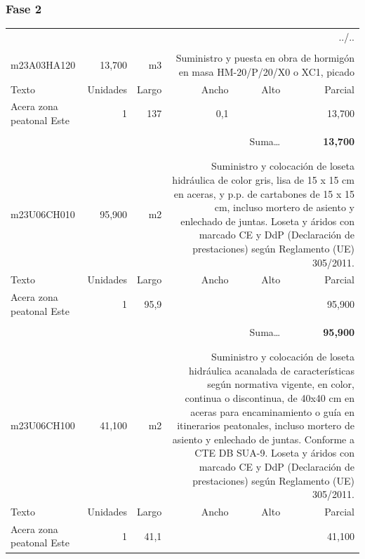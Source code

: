 \documentclass{book}%
\begin{document}
%
\subsubsection{Fase 2}%
\begin{longtable}{lrrrrr}%
\multicolumn{6}{r}{../..}\\%
\endfoot%
\endlastfoot%
&&&&&\\%
m23A03HA120&    13,700& m3&\multicolumn{3}{p{6cm}}{\scriptsize Suministro y puesta en obra de hormigón en masa HM-20/P/20/X0 o XC1, picado\normalsize}\\%
Texto&Unidades&Largo&Ancho&Alto&Parcial\\%
\hline%
\multicolumn{1}{p{3.5cm}}{Acera zona peatonal Este}&1&137&0,1&&    13,700\\%
&&&&&\\%
\multicolumn{5}{r}{Suma\ldots}&\textbf{    13,700}\\%
\hline%
&&&&&\\%
&&&&&\\%
m23U06CH010&    95,900& m2&\multicolumn{3}{p{6cm}}{\scriptsize Suministro y colocación de loseta hidráulica de color gris, lisa de 15 x 15 cm en aceras, y p.p. de cartabones de 15 x 15 cm, incluso mortero de asiento y enlechado de juntas. Loseta y áridos con marcado CE y DdP (Declaración de prestaciones) según Reglamento (UE) 305/2011.\normalsize}\\%
Texto&Unidades&Largo&Ancho&Alto&Parcial\\%
\hline%
\multicolumn{1}{p{3.5cm}}{Acera zona peatonal Este}&1&95,9&&&    95,900\\%
&&&&&\\%
\multicolumn{5}{r}{Suma\ldots}&\textbf{    95,900}\\%
\hline%
&&&&&\\%
&&&&&\\%
m23U06CH100&    41,100& m2&\multicolumn{3}{p{6cm}}{\scriptsize Suministro y colocación de loseta hidráulica acanalada de características según normativa vigente, en color, continua o discontinua, de 40x40 cm en aceras para encaminamiento o guía en itinerarios peatonales, incluso mortero de asiento y enlechado de juntas. Conforme a CTE DB SUA-9. Loseta y áridos con marcado CE y DdP (Declaración de prestaciones) según Reglamento (UE) 305/2011.\normalsize}\\%
Texto&Unidades&Largo&Ancho&Alto&Parcial\\%
\hline%
\multicolumn{1}{p{3.5cm}}{Acera zona peatonal Este}&1&41,1&&&    41,100\\%

\end{longtable}
\end{document}
